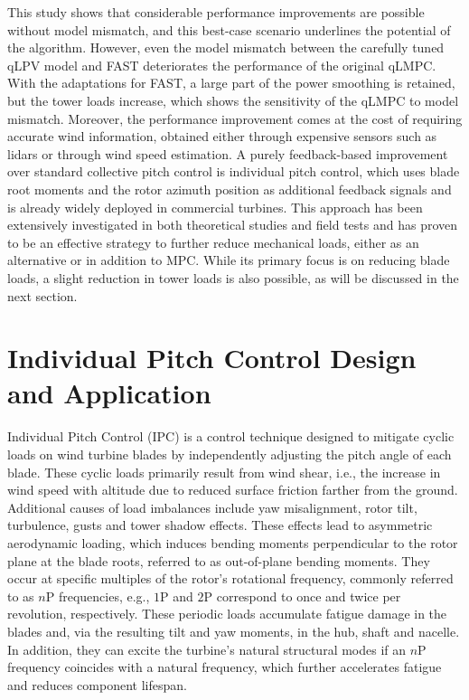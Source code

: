 This study shows that considerable performance improvements are possible without model mismatch, and this best-case scenario underlines the potential of the algorithm. However, even the model mismatch between the carefully tuned qLPV model and FAST deteriorates the performance of the original qLMPC. With the adaptations for FAST, a large part of the power smoothing is retained, but the tower loads increase, which shows the sensitivity of the qLMPC to model mismatch. Moreover, the performance improvement comes at the cost of requiring accurate wind information, obtained either through expensive sensors such as lidars or through wind speed estimation. A purely feedback-based improvement over standard collective pitch control is individual pitch control, which uses blade root moments and the rotor azimuth position as additional feedback signals and is already widely deployed in commercial turbines. This approach has been extensively investigated in both theoretical studies and field tests and has proven to be an effective strategy to further reduce mechanical loads, either as an alternative or in addition to MPC. While its primary focus is on reducing blade loads, a slight reduction in tower loads is also possible, as will be discussed in the next section.

\section{Individual Pitch Control Design and Application}\label{section:Individal Pitch PI Control}
Individual Pitch Control (IPC) is a control technique designed to mitigate cyclic loads on wind turbine blades by independently adjusting the pitch angle of each blade. These cyclic loads primarily result from wind shear, i.e., the increase in wind speed with altitude due to reduced surface friction farther from the ground. Additional causes of load imbalances include yaw misalignment, rotor tilt, turbulence, gusts and tower shadow effects. These effects lead to asymmetric aerodynamic loading, which induces bending moments perpendicular to the rotor plane at the blade roots, referred to as out-of-plane bending moments. They occur at specific multiples of the rotor's rotational frequency, commonly referred to as $n\text{P}$ frequencies, e.g., $1\text{P}$ and $2\text{P}$ correspond to once and twice per revolution, respectively. These periodic loads accumulate fatigue damage in the blades and, via the resulting tilt and yaw moments, in the hub, shaft and nacelle. In addition, they can excite the turbine's natural structural modes if an $n\text{P}$ frequency coincides with a natural frequency, which further accelerates fatigue and reduces component lifespan.

